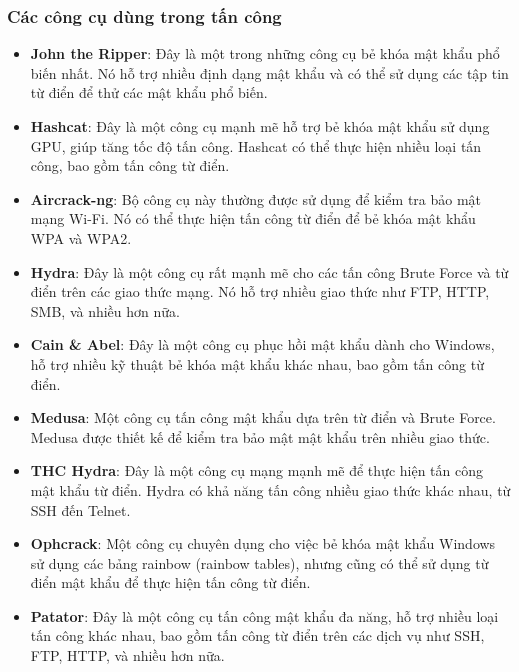 \subsubsection{ Các công cụ dùng trong tấn công}
\begin{itemize}
    \item \textbf{John the Ripper}: Đây là một trong những công cụ bẻ khóa mật khẩu phổ biến nhất. Nó hỗ trợ nhiều định dạng mật khẩu và có thể sử dụng các tập tin từ điển để thử các mật khẩu phổ biến.
    \item \textbf{Hashcat}: Đây là một công cụ mạnh mẽ hỗ trợ bẻ khóa mật khẩu sử dụng GPU, giúp tăng tốc độ tấn công. Hashcat có thể thực hiện nhiều loại tấn công, bao gồm tấn công từ điển.
    \item \textbf{Aircrack-ng}: Bộ công cụ này thường được sử dụng để kiểm tra bảo mật mạng Wi-Fi. Nó có thể thực hiện tấn công từ điển để bẻ khóa mật khẩu WPA và WPA2.
    \item \textbf{Hydra}: Đây là một công cụ rất mạnh mẽ cho các tấn công Brute Force và từ điển trên các giao thức mạng. Nó hỗ trợ nhiều giao thức như FTP, HTTP, SMB, và nhiều hơn nữa.
    \item \textbf{Cain \& Abel}: Đây là một công cụ phục hồi mật khẩu dành cho Windows, hỗ trợ nhiều kỹ thuật bẻ khóa mật khẩu khác nhau, bao gồm tấn công từ điển.
    \item \textbf{Medusa}: Một công cụ tấn công mật khẩu dựa trên từ điển và Brute Force. Medusa được thiết kế để kiểm tra bảo mật mật khẩu trên nhiều giao thức.
    \item \textbf{THC Hydra}: Đây là một công cụ mạng mạnh mẽ để thực hiện tấn công mật khẩu từ điển. Hydra có khả năng tấn công nhiều giao thức khác nhau, từ SSH đến Telnet.
    \item \textbf{Ophcrack}: Một công cụ chuyên dụng cho việc bẻ khóa mật khẩu Windows sử dụng các bảng rainbow (rainbow tables), nhưng cũng có thể sử dụng từ điển mật khẩu để thực hiện tấn công từ điển.
    \item \textbf{Patator}: Đây là một công cụ tấn công mật khẩu đa năng, hỗ trợ nhiều loại tấn công khác nhau, bao gồm tấn công từ điển trên các dịch vụ như SSH, FTP, HTTP, và nhiều hơn nữa.
\end{itemize}